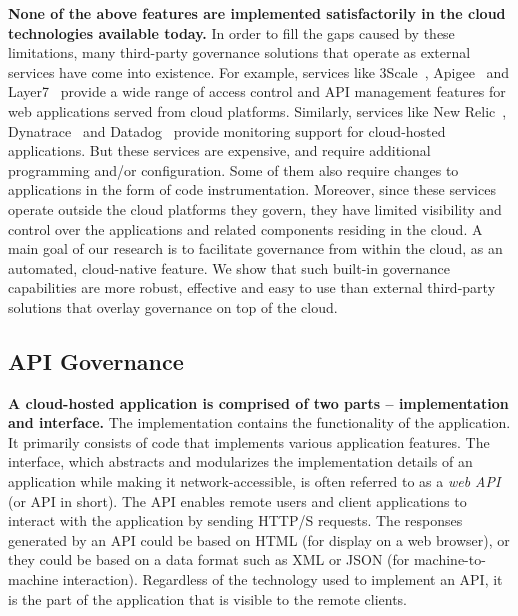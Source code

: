 \textbf{None of the above features are implemented satisfactorily in the cloud technologies available today.}
In order to fill the gaps caused by these limitations, many third-party governance solutions that operate as external services
have come into existence. For example, services like 3Scale~\cite{3scale}, Apigee~\cite{apigee} and Layer7~\cite{layer7} provide a wide range
of access control and API management features for web applications served from cloud platforms. Similarly, 
services like New Relic~\cite{newrelic}, Dynatrace~\cite{dynatrace} and Datadog~\cite{datadog} provide monitoring support for cloud-hosted 
applications. But these services are expensive, and require additional programming and/or configuration.
Some of them also require changes to applications in the form of code instrumentation. Moreover,
since these services operate outside the cloud platforms they govern, they have limited visibility and control
over the applications and related components residing in the cloud. A main goal of our research is to facilitate governance
from within the cloud, as an automated, cloud-native feature. We show that such built-in governance capabilities are
more robust, effective and easy to use than external third-party solutions that overlay governance on top of the
cloud.

\subsection{API Governance}
\textbf{A cloud-hosted application is comprised of two parts -- implementation and interface.} The implementation
contains the functionality of the application. It primarily consists of code that implements
various application features. 
The interface, which abstracts and modularizes the implementation details of an application while making
it network-accessible, is often referred to as a \textit{web API} (or API in short).
The API enables remote users and client applications to interact with the application by sending
HTTP/S requests. The responses generated by an API could be based on HTML (for display on a web
browser), or they could be based on a data format such as XML or JSON (for machine-to-machine 
interaction). Regardless of the technology used to implement an API, it is the part of the application 
that is visible to the remote clients. 

